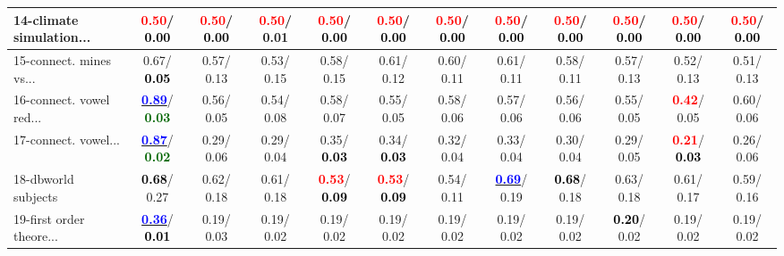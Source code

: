 \begin{table}[h]
\begin{center}
{\begin{tabular}{lc|c|c|c|c|c|c|c|c|c|c}
14-climate simulation... & \textcolor{red}{\textbf{  0.50}}/\textcolor{black}{\textbf{  0.00}} & \textcolor{red}{\textbf{  0.50}}/\textcolor{black}{\textbf{  0.00}} & \textcolor{red}{\textbf{  0.50}}/  0.01 & \textcolor{red}{\textbf{  0.50}}/\textcolor{black}{\textbf{  0.00}} & \textcolor{red}{\textbf{  0.50}}/\textcolor{black}{\textbf{  0.00}} & \textcolor{red}{\textbf{  0.50}}/\textcolor{black}{\textbf{  0.00}} & \textcolor{red}{\textbf{  0.50}}/\textcolor{black}{\textbf{  0.00}} & \textcolor{red}{\textbf{  0.50}}/\textcolor{black}{\textbf{  0.00}} & \textcolor{red}{\textbf{  0.50}}/\textcolor{black}{\textbf{  0.00}} & \textcolor{red}{\textbf{  0.50}}/\textcolor{black}{\textbf{  0.00}} & \textcolor{red}{\textbf{  0.50}}/\textcolor{black}{\textbf{  0.00}} \\ \hline
15-connect. mines vs... &   0.67/\textcolor{black}{\textbf{  0.05}} &   0.57/  0.13 &   0.53/  0.15 &   0.58/  0.15 &   0.61/  0.12 &   0.60/  0.11 &   0.61/  0.11 &   0.58/  0.11 &   0.57/  0.13 &   0.52/  0.13 &   0.51/  0.13 \\
16-connect. vowel red... & \underline{\textcolor{blue}{\textbf{  0.89}}}/\textcolor{darkgreen}{\textbf{  0.03}} &   0.56/  0.05 &   0.54/  0.08 &   0.58/  0.07 &   0.55/  0.05 &   0.58/  0.06 &   0.57/  0.06 &   0.56/  0.06 &   0.55/  0.05 & \textcolor{red}{\textbf{  0.42}}/  0.05 &   0.60/  0.06 \\
17-connect. vowel... & \underline{\textcolor{blue}{\textbf{  0.87}}}/\textcolor{darkgreen}{\textbf{  0.02}} &   0.29/  0.06 &   0.29/  0.04 &   0.35/\textcolor{black}{\textbf{  0.03}} &   0.34/\textcolor{black}{\textbf{  0.03}} &   0.32/  0.04 &   0.33/  0.04 &   0.30/  0.04 &   0.29/  0.05 & \textcolor{red}{\textbf{  0.21}}/\textcolor{black}{\textbf{  0.03}} &   0.26/  0.06 \\
18-dbworld subjects & \textcolor{black}{\textbf{  0.68}}/  0.27 &   0.62/  0.18 &   0.61/  0.18 & \textcolor{red}{\textbf{  0.53}}/\textcolor{black}{\textbf{  0.09}} & \textcolor{red}{\textbf{  0.53}}/\textcolor{black}{\textbf{  0.09}} &   0.54/  0.11 & \underline{\textcolor{blue}{\textbf{  0.69}}}/  0.19 & \textcolor{black}{\textbf{  0.68}}/  0.18 &   0.63/  0.18 &   0.61/  0.17 &   0.59/  0.16 \\
19-first order theore... & \underline{\textcolor{blue}{\textbf{  0.36}}}/\textcolor{black}{\textbf{  0.01}} &   0.19/  0.03 &   0.19/  0.02 &   0.19/  0.02 &   0.19/  0.02 &   0.19/  0.02 &   0.19/  0.02 &   0.19/  0.02 & \textcolor{black}{\textbf{  0.20}}/  0.02 &   0.19/  0.02 &   0.19/  0.02 \\

\end{tabular}}
\end{center}
\end{table}
